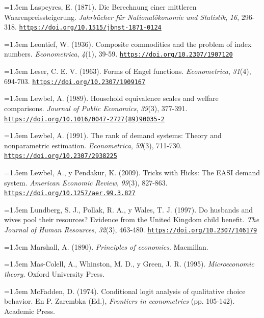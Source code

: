 \documentclass[10pt,a4paper]{article}
\begin{document}
\noindent\hangindent=1.5em Laspeyres, E. (1871). Die Berechnung einer mittleren Waarenpreissteigerung. \textit{Jahrbücher für Nationalökonomie und Statistik}, \textit{16}, 296-318. \href{https://doi.org/10.1515/jbnst-1871-0124}{\nolinkurl{https://doi.org/10.1515/jbnst-1871-0124}}

\noindent\hangindent=1.5em Leontief, W. (1936). Composite commodities and the problem of index numbers. \textit{Econometrica}, \textit{4}(1), 39-59. \href{https://doi.org/10.2307/1907120}{\nolinkurl{https://doi.org/10.2307/1907120}}

\noindent\hangindent=1.5em Leser, C. E. V. (1963). Forms of Engel functions. \textit{Econometrica}, \textit{31}(4), 694-703. \href{https://doi.org/10.2307/1909167}{\nolinkurl{https://doi.org/10.2307/1909167}}

\noindent\hangindent=1.5em Lewbel, A. (1989). Household equivalence scales and welfare comparisons. \textit{Journal of Public Economics}, \textit{39}(3), 377-391. \href{https://doi.org/10.1016/0047-2727(89)90035-2}{\nolinkurl{https://doi.org/10.1016/0047-2727(89)90035-2}}

\noindent\hangindent=1.5em Lewbel, A. (1991). The rank of demand systems: Theory and nonparametric estimation. \textit{Econometrica}, \textit{59}(3), 711-730. \href{https://doi.org/10.2307/2938225}{\nolinkurl{https://doi.org/10.2307/2938225}}

\noindent\hangindent=1.5em Lewbel, A., y Pendakur, K. (2009). Tricks with Hicks: The EASI demand system. \textit{American Economic Review}, \textit{99}(3), 827-863. \href{https://doi.org/10.1257/aer.99.3.827}{\nolinkurl{https://doi.org/10.1257/aer.99.3.827}}

\noindent\hangindent=1.5em Lundberg, S. J., Pollak, R. A., y Wales, T. J. (1997). Do husbands and wives pool their resources? Evidence from the United Kingdom child benefit. \textit{The Journal of Human Resources}, \textit{32}(3), 463-480. \href{https://doi.org/10.2307/146179}{\nolinkurl{https://doi.org/10.2307/146179}}

\noindent\hangindent=1.5em Marshall, A. (1890). \textit{Principles of economics}. Macmillan.

\noindent\hangindent=1.5em Mas-Colell, A., Whinston, M. D., y Green, J. R. (1995). \textit{Microeconomic theory}. Oxford University Press.

\noindent\hangindent=1.5em McFadden, D. (1974). Conditional logit analysis of qualitative choice behavior. En P. Zarembka (Ed.), \textit{Frontiers in econometrics} (pp. 105-142). Academic Press.
\end{document}
